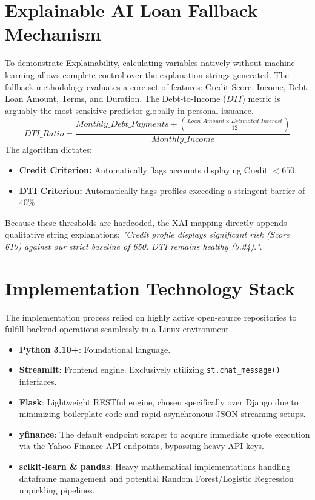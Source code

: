 \documentclass[12pt,a4paper]{report}
\begin{document}
\section{Explainable AI Loan Fallback Mechanism}
To demonstrate Explainability, calculating variables natively without machine learning allows complete control over the explanation strings generated. The fallback methodology evaluates a core set of features: Credit Score, Income, Debt, Loan Amount, Terms, and Duration.
The Debt-to-Income ($DTI$) metric is arguably the most sensitive predictor globally in personal issuance.
\begin{equation}
DTI\_Ratio = \frac{Monthly\_Debt\_Payments + (\frac{Loan\_Amount \times Estimated\_Interest}{12})}{Monthly\_Income}
\end{equation}
The algorithm dictates:
\begin{itemize}
    \item \textbf{Credit Criterion:} Automatically flags accounts displaying Credit $< 650$.
    \item \textbf{DTI Criterion:} Automatically flags profiles exceeding a stringent barrier of $40\%$.
\end{itemize}
Because these thresholds are hardcoded, the XAI mapping directly appends qualitative string explanations: \textit{"Credit profile displays significant risk (Score = 610) against our strict baseline of 650. DTI remains healthy (0.24)."}.

\section{Implementation Technology Stack}
The implementation process relied on highly active open-source repositories to fulfill backend operations seamlessly in a Linux environment.
\begin{itemize}
    \item \textbf{Python 3.10+}: Foundational language.
    \item \textbf{Streamlit}: Frontend engine. Exclusively utilizing \texttt{st.chat\_message()} interfaces. 
    \item \textbf{Flask}: Lightweight RESTful engine, chosen specifically over Django due to minimizing boilerplate code and rapid asynchronous JSON streaming setups.
    \item \textbf{yfinance}: The default endpoint scraper to acquire immediate quote execution via the Yahoo Finance API endpoints, bypassing heavy API keys.
    \item \textbf{scikit-learn \& pandas}: Heavy mathematical implementations handling dataframe management and potential Random Forest/Logistic Regression unpickling pipelines.
\end{itemize}
\end{document}
